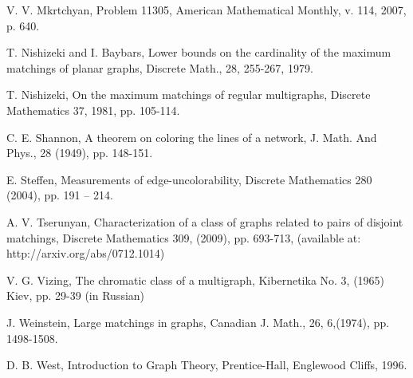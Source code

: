 \documentclass[fleqn,12pt,twoside]{article}
\begin{document}
\begin{thebibliography}{99}
 V. V. Mkrtchyan, Problem 11305, American Mathematical
Monthly, v. 114, 2007, p. 640.

 T. Nishizeki and I. Baybars, Lower bounds on the
cardinality of the maximum matchings of planar graphs, Discrete
Math., 28, 255-267, 1979.

 T. Nishizeki, On the maximum matchings of regular
multigraphs, Discrete Mathematics 37, 1981, pp. 105-114.


 C. E. Shannon, A theorem on coloring the lines of a
network, J. Math. And Phys., 28 (1949), pp. 148-151.

 E. Steffen, Measurements of edge-uncolorability, Discrete
Mathematics 280 (2004), pp. 191 -- 214.

 A. V. Tserunyan, Characterization of a class
of graphs related to pairs of disjoint matchings, Discrete
Mathematics 309, (2009), pp. 693-713, (available at:
http://arxiv.org/abs/0712.1014)

 V. G. Vizing, The chromatic class of a multigraph,
Kibernetika No. 3, (1965) Kiev, pp. 29-39 (in Russian)

 J. Weinstein, Large matchings in graphs, Canadian J.
Math., 26, 6,(1974), pp. 1498-1508.

 D. B. West, Introduction to Graph Theory, Prentice-Hall,
Englewood Cliffs, 1996.
\end{thebibliography}
\end{document}
